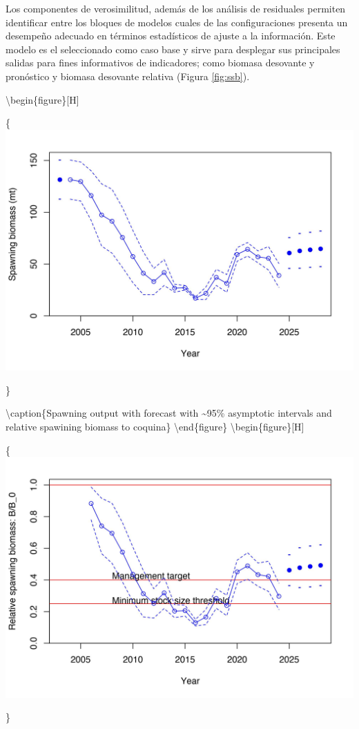 \documentclass[
]{article}
\begin{document}
Los componentes de verosimilitud, además de los análisis de residuales permiten identificar entre los bloques de modelos cuales de las configuraciones presenta un desempeño adecuado en términos estadísticos de ajuste a la información. Este modelo es el seleccionado como caso base y sirve para desplegar sus principales salidas para fines informativos de indicadores; como biomasa desovante y pronóstico y biomasa desovante relativa (Figura \ref{fig:ssb}).

\textbackslash begin\{figure\}{[}H{]}

\{\centering \includegraphics[width=0.8\linewidth]{Dtrunculus_SS3_2024_files/figure-latex/ssb-1}

\}

\textbackslash caption\{\label{fig:ssb}Spawning output with forecast with \textasciitilde95\% asymptotic intervals and relative spawining biomass to coquina\}\label{fig:ssb-1}
\textbackslash end\{figure\}
\textbackslash begin\{figure\}{[}H{]}

\{\centering \includegraphics[width=0.8\linewidth]{Dtrunculus_SS3_2024_files/figure-latex/ssb-2}

\}
\end{document}
